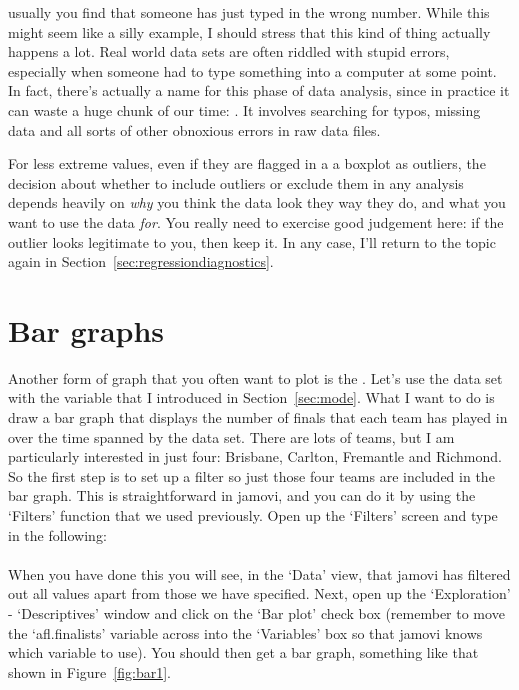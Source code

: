 usually you find that someone has just typed in the wrong number. While this might seem like a silly example, I should stress that this kind of thing actually happens a lot. Real world data sets are often riddled with stupid errors, especially when someone had to type something into a computer at some point. In fact, there's actually a name for this phase of data analysis, since in practice it can waste a huge chunk of our time: . It involves searching for typos, missing data and all sorts of other obnoxious errors in raw data files.

For less extreme values, even if they are flagged in a a boxplot as outliers, the decision about whether to include outliers or exclude them in any analysis depends heavily on {\it why} you think the data look they way they do, and what you want to use the data {\it for}. You really need to exercise good judgement here: if the outlier looks legitimate to you, then keep it. In any case, I'll return to the topic again in Section~\ref{sec:regressiondiagnostics}. 



\section{Bar graphs\label{sec:bargraph}}

Another form of graph that you often want to plot is the . Let's use the  data set with the  variable that I introduced in Section~\ref{sec:mode}. What I want to do is draw a bar graph that displays the number of finals that each team has played in over the time spanned by the  data set. There are lots of teams, but I am particularly interested in just four: Brisbane, Carlton, Fremantle and Richmond. So the first step is to set up a filter so just those four teams are included in the bar graph. This is straightforward in jamovi, and you can do it by using the `Filters' function that we used previously. Open up the `Filters' screen and type in the following: \\

 \\

When you have done this you will see, in the `Data' view, that jamovi has filtered out all values apart from those we have specified. Next, open up the `Exploration' - `Descriptives' window and click on the `Bar plot' check box (remember to move the `afl.finalists' variable across into the `Variables' box so that jamovi knows which variable to use). You should then get a bar graph, something like that shown in Figure~\ref{fig:bar1}.

